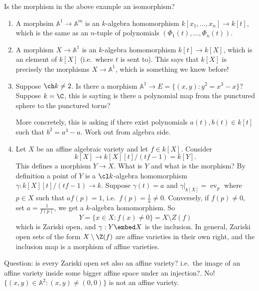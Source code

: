 \documentclass[a4paper]{article}
\renewcommand{\A}{\mathbb{A}}
\begin{document}
\begin{question}
  Is the morphism in the above example an isomorphism?
\end{question}

\begin{eg}\leavevmode
  \begin{enumerate}
  \item A morphsim \(\A^1 \to \A^m\) is an \(k\)-algebra homomorphism \(k[x_1, \dots, x_n] \to k[t]\), which is the same as an \(n\)-tuple of polynomials \((\Phi_1(t), \dots, \Phi_n(t))\).
  \item A morphism \(X \to \A^1\) is an \(k\)-algebra homomorphism \(k[t] \to k[X]\), which is an element of \(k[X]\) (i.e.\ where \(t\) is sent to). This says that \(k[X]\) is precisely the morphisms \(X \to \A^1\), which is something we knew before!
  \item Suppose \(\ch k \neq 2\). Is there a morphism \(\A^1 \to E = \{(x, y): y^2 = x^3 - x\}\)? Suppose \(k = \C\), this is sayting is there a polynomial map from the punctured sphere to the punctured torus?

    More concretely, this is asking if there exist polynomials \(a(t), b(t) \in k[t]\) such that \(b^2 = a^3 - a\). Work out from algebra side.
  \item Let \(X\) be an affine algebraic variety and let \(f \in k[X]\). Consider
    \[
      k[X] \to k[X][t]/(tf - 1) = k[Y].
    \]
    This defines a morphism \(Y \to X\). What is \(Y\) and what is the morphism? By definition a point of \(Y\) is a \(\cl k\)-algebra homomorphism \(\gamma: k[X][t]/(tf - 1) \to k\). Suppose \(\gamma(t) = a\) and \(\gamma|_{k[X]} = \operatorname{ev}_p\) where \(p \in X\) such that \(a f(p) = 1\), i.e.\ \(f(p) = \frac{1}{a} \neq 0\). Conversely, if \(f(p) \neq 0\), set \(a = \frac{1}{f(p)}\), we get a \(k\)-algebra homomorphism. So
    \[
      Y = \{x \in X: f(x) \neq 0\} = X \setminus Z(f)
    \]
    which is Zariski open, and \(\gamma: Y \embed X\) is the inclusion. In general, Zariski open sets of the form \(X \setminus \Z(f)\) are affine varieties in their own right, and the inclusion map is a morphism of affine varieties.
  \end{enumerate}
\end{eg}

Question: is every Zariski open set also an affine variety? i.e.\ the image of an affine variety inside some bigger affine space under an injection?. No! \(\{(x, y) \in \A^2: (x, y) \neq (0, 0)\}\) is not an affine variety.
\end{document}
